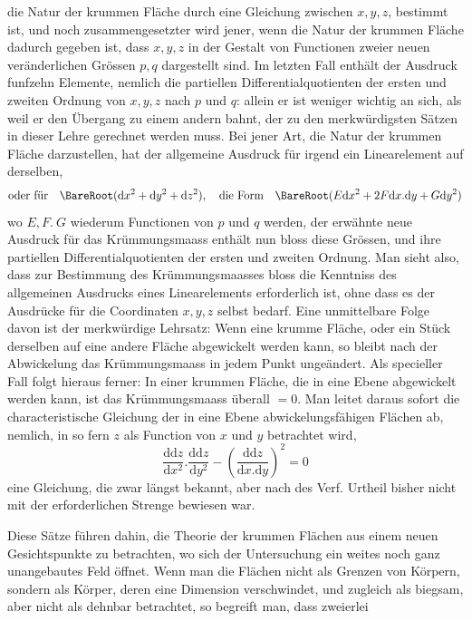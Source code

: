 %
die Natur der krummen Fläche durch eine Gleichung zwischen \(x,y,z\), bestimmt ist, und noch zusammengesetzter wird jener, wenn die Natur der krummen Fläche dadurch gegeben ist, dass \(x,y,z\) in der Gestalt von Functionen zweier neuen veränderlichen Grössen \(p,q\) dargestellt sind. Im letzten Fall enthält der Ausdruck funfzehn Elemente, nemlich die partiellen Differentialquotienten der ersten und zweiten Ordnung von \(x,y,z\) nach \(p\) und \(q\): allein er ist weniger wichtig an sich, als weil er den Übergang zu einem andern bahnt, der zu den merkwürdigsten Sätzen in dieser Lehre gerechnet werden muss. Bei jener Art, die Natur der krummen Fläche darzustellen, hat der allgemeine Ausdruck für irgend ein Linearelement auf derselben,
\[
\text{oder für}\quad\BareRoot(\mathrm{d}x^2+\mathrm{d}y^2+\mathrm{d}z^2),\quad\text{die Form}\quad\BareRoot(E\mathrm{d}x^2+2F\mathrm{d}x\mathord{.}\mathrm{d}y+G\mathrm{d}y^2)
\]
wo \(E,F.\ G\) wiederum Functionen von \(p\) und \(q\) werden, der erwähnte neue Ausdruck für das Krümmungsmaass enthält nun bloss diese Grössen, und ihre partiellen Differentialquotienten der ersten und zweiten Ordnung. Man sieht also, dass zur Bestimmung des Krümmungsmaasses bloss die Kenntniss des allgemeinen Ausdrucks eines Linearelements erforderlich ist, ohne dass es der Ausdrücke für die Coordinaten \(x,y,z\) selbst bedarf. Eine unmittelbare Folge davon ist der merkwürdige Lehrsatz: Wenn eine krumme Fläche, oder ein Stück derselben auf eine andere Fläche abgewickelt werden kann, so bleibt nach der Abwickelung das Krümmungsmaass in jedem Punkt ungeändert. Als specieller Fall folgt hieraus ferner: In einer krummen Fläche, die in eine Ebene abgewickelt werden kann, ist das Krümmungsmaass überall \(=0\). Man leitet daraus sofort die characteristische Gleichung der in eine Ebene abwickelungsfähigen Flächen ab, nemlich, in so fern \(z\) als Function von \(x\) und \(y\) betrachtet wird,
\[
\frac{\mathrm{dd}z}{\mathrm{d}x^2}\mathord{.}\frac{\mathrm{dd}z}{\mathrm{d}y^2}-(\frac{\mathrm{dd}z}{\mathrm{d}x\mathord{.}\mathrm{d}y})^2=0
\]
eine Gleichung, die zwar längst bekannt, aber nach des Verf. Urtheil bisher nicht mit der erforderlichen Strenge bewiesen war.

Diese Sätze führen dahin, die Theorie der krummen Flächen aus einem neuen Gesichtspunkte zu betrachten, wo sich der Untersuchung ein weites noch ganz unangebautes Feld öffnet. Wenn man die Flächen nicht als Grenzen von Körpern, sondern als Körper, deren eine Dimension verschwindet, und zugleich als biegsam, aber nicht als dehnbar betrachtet, so begreift man, dass zweierlei
